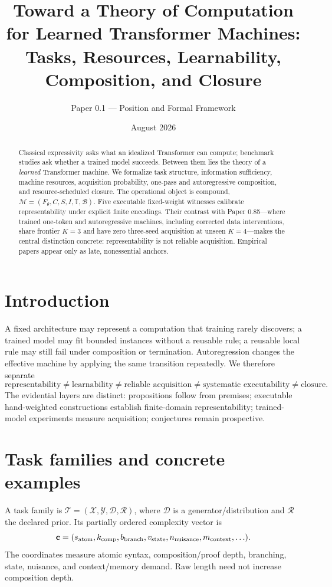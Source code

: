 \documentclass[10pt]{article}
\title{Toward a Theory of Computation for Learned Transformer Machines:\\Tasks, Resources, Learnability, Composition, and Closure}
\author{Paper 0.1 --- Position and Formal Framework}\date{August 2026}
\begin{document}
\maketitle
\begin{abstract}
Classical expressivity asks what an idealized Transformer can compute; benchmark studies ask whether a trained model succeeds. Between them lies the theory of a \emph{learned} Transformer machine. We formalize task structure, information sufficiency, machine resources, acquisition probability, one-pass and autoregressive composition, and resource-scheduled closure. The operational object is compound, $\mathcal M=(F_\theta,C,S,I,\mathbb T,\mathcal B)$. Five executable fixed-weight witnesses calibrate representability under explicit finite encodings. Their contrast with Paper 0.85---where trained one-token and autoregressive machines, including corrected data interventions, share frontier $K=3$ and have zero three-seed acquisition at unseen $K=4$---makes the central distinction concrete: representability is not reliable acquisition. Empirical papers appear only as late, nonessential anchors.
\end{abstract}

\section{Introduction}
A fixed architecture may represent a computation that training rarely discovers; a trained model may fit bounded instances without a reusable rule; a reusable local rule may still fail under composition or termination. Autoregression changes the effective machine by applying the same transition repeatedly. We therefore separate
\[
\boxed{\text{representability}\ne\text{learnability}\ne\text{reliable acquisition}\ne\text{systematic executability}\ne\text{closure}.}
\]
The evidential layers are distinct: propositions follow from premises; executable hand-weighted constructions establish finite-domain representability; trained-model experiments measure acquisition; conjectures remain prospective.

\section{Task families and concrete examples}
A task family is $\mathcal T=(\mathcal X,\mathcal Y,\mathcal D,\mathcal R)$, where $\mathcal D$ is a generator/distribution and $\mathcal R$ the declared prior. Its partially ordered complexity vector is
\[
\mathbf c=(s_{\rm atom},k_{\rm comp},b_{\rm branch},v_{\rm state},n_{\rm nuisance},m_{\rm context},\ldots).
\]
The coordinates measure atomic syntax, composition/proof depth, branching, state, nuisance, and context/memory demand. Raw length need not increase composition depth.
\end{document}
